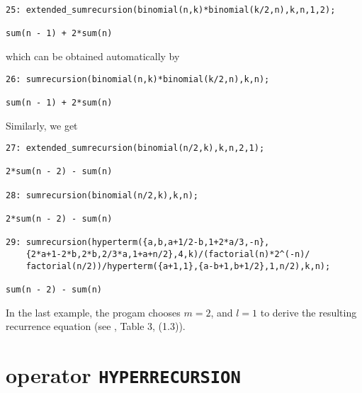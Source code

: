 {\small
\begin{verbatim}
25: extended_sumrecursion(binomial(n,k)*binomial(k/2,n),k,n,1,2);

sum(n - 1) + 2*sum(n)
\end{verbatim}
}\noindent
which can be obtained automatically by
{\small
\begin{verbatim}
26: sumrecursion(binomial(n,k)*binomial(k/2,n),k,n);

sum(n - 1) + 2*sum(n)
\end{verbatim}
}\noindent
Similarly, we get
{\small
\begin{verbatim}
27: extended_sumrecursion(binomial(n/2,k),k,n,2,1);

2*sum(n - 2) - sum(n)

28: sumrecursion(binomial(n/2,k),k,n);

2*sum(n - 2) - sum(n)

29: sumrecursion(hyperterm({a,b,a+1/2-b,1+2*a/3,-n},
    {2*a+1-2*b,2*b,2/3*a,1+a+n/2},4,k)/(factorial(n)*2^(-n)/
    factorial(n/2))/hyperterm({a+1,1},{a-b+1,b+1/2},1,n/2),k,n);

sum(n - 2) - sum(n)
\end{verbatim}
}\noindent
In the last example, the progam chooses $m=2$, and $l=1$ to derive the
resulting recurrence equation (see \cite{Koepf}, Table 3, (1.3)).


\section{\REDUCE{} operator {\tt HYPERRECURSION}}

